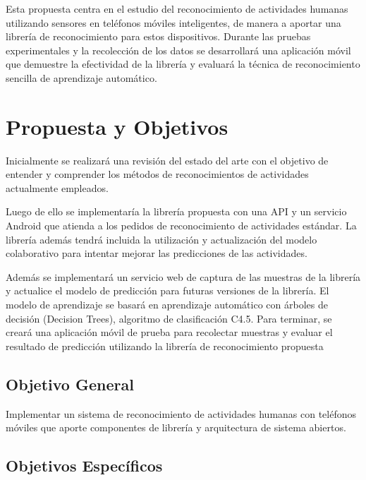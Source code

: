 Esta propuesta centra en el estudio del reconocimiento de actividades humanas utilizando sensores en teléfonos móviles inteligentes, de manera a aportar una librería de reconocimiento para estos dispositivos. Durante las pruebas experimentales y la recolección de los datos se desarrollará una aplicación móvil que demuestre la efectividad de la librería y evaluará la técnica de reconocimiento sencilla de aprendizaje automático.

\section{Propuesta y Objetivos}
Inicialmente se realizará una revisión del estado del arte con el objetivo de entender y comprender los métodos de reconocimientos de actividades actualmente empleados.
 
Luego de ello se implementaría la librería propuesta con una API y un servicio Android que atienda a los pedidos de reconocimiento de actividades estándar. La librería además tendrá incluida la utilización y actualización del modelo colaborativo para intentar mejorar las predicciones de las actividades.

Además se implementará un servicio web de captura de las muestras de la librería y actualice el modelo de predicción para futuras versiones de la librería. El modelo de aprendizaje se basará en aprendizaje automático con árboles de decisión (Decision Trees), algoritmo de clasificación C4.5.
Para terminar, se creará una aplicación móvil de prueba para recolectar muestras y evaluar el resultado de predicción utilizando la librería de reconocimiento propuesta

\subsection{Objetivo General}
Implementar un sistema de reconocimiento de actividades humanas con teléfonos móviles que aporte componentes de librería y arquitectura de sistema abiertos.

\subsection{Objetivos Específicos}


